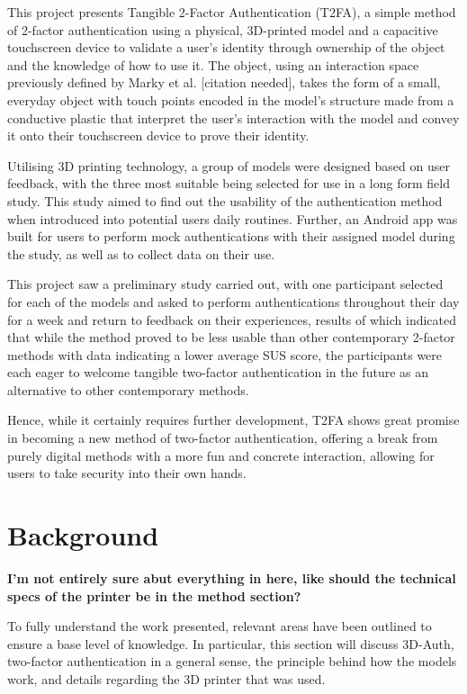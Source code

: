 \documentclass{l4proj}
\begin{document}
This project presents Tangible 2-Factor Authentication (T2FA), a simple method of 2-factor authentication using a physical, 3D-printed model and a capacitive touchscreen device to validate a user's identity through ownership of the object and the knowledge of how to use it. The object, using an interaction space previously defined by Marky et al. [citation needed], takes the form of a small, everyday object with touch points encoded in the model's structure made from a conductive plastic that interpret the user's interaction with the model and convey it onto their touchscreen device to prove their identity. 

Utilising 3D printing technology, a group of models were designed based on user feedback, with the three most suitable being selected for use in a long form field study. This study aimed to find out the usability of the authentication method when introduced into potential users daily routines. Further, an Android app was built for users to perform mock authentications with their assigned model during the study, as well as to collect data on their use.

This project saw a preliminary study carried out, with one participant selected for each of the models and asked to perform authentications throughout their day for a week and return to feedback on their experiences, results of which indicated that while the method proved to be less usable than other contemporary 2-factor methods with data indicating a lower average SUS score, the participants were each eager to welcome tangible two-factor authentication in the future as an alternative to other contemporary methods.

Hence, while it certainly requires further development, T2FA shows great promise in becoming a new method of two-factor authentication, offering a break from purely digital methods with a more fun and concrete interaction, allowing for users to take security into their own hands.


\chapter{Background}

\textbf{I'm not entirely sure abut everything in here, like should the technical specs of the printer be in the method section?}

To fully understand the work presented, relevant areas have been outlined to ensure a base level of knowledge. In particular, this section will discuss 3D-Auth, two-factor authentication in a general sense, the principle behind how the models work, and details regarding the 3D printer that was used.
\end{document}
